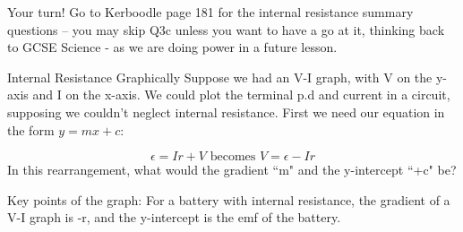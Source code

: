 \documentclass[../Main.tex]{subfiles}
\begin{document}
\begin{frame}{Your turn!}
    Go to Kerboodle page 181 for the internal resistance summary questions -- you may skip Q3c unless you want to have a go at it, thinking back to GCSE Science - as we are doing power in a future lesson.
\end{frame}

\begin{frame}{Internal Resistance Graphically}
Suppose we had an V-I graph, with V on the y-axis and I on the x-axis. We could plot the terminal p.d and current in a circuit, supposing we couldn't neglect internal resistance. First we need our equation in the form $y=mx+c$:

\begin{equation*}
    \epsilon = Ir + V \mbox{ becomes } V=\epsilon - Ir
\end{equation*}
In this rearrangement, what would the gradient ``m" and the y-intercept ``+c" be? \pause

\begin{block}{Key points of the graph:}
For a battery with internal resistance, the gradient of a V-I graph is -r, and the y-intercept is the emf of the battery.
\end{block}

\end{frame}
\end{document}
